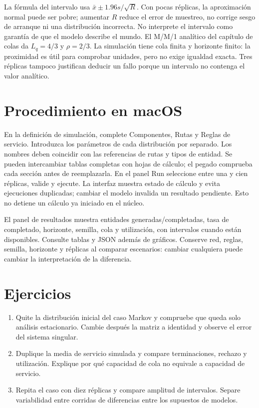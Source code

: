La fórmula del intervalo usa \(\bar x\pm1.96s/\sqrt R\). Con pocas
réplicas, la aproximación normal puede ser pobre; aumentar \(R\) reduce el
error de muestreo, no corrige sesgo de arranque ni una distribución incorrecta.
No interprete el intervalo como garantía de que el modelo describe el mundo.
El M/M/1 analítico del capítulo de colas da \(L_q=4/3\) y \(\rho=2/3\).
La simulación tiene cola finita y horizonte finito: la proximidad es útil para
comprobar unidades, pero no exige igualdad exacta. Tres réplicas tampoco
justifican deducir un fallo porque un intervalo no contenga el valor analítico.

\section{Procedimiento en macOS}
En la definición de simulación, complete Componentes, Rutas y Reglas de servicio.
Introduzca los parámetros de cada distribución por separado. Los nombres deben
coincidir con las referencias de rutas y tipos de entidad. Se pueden intercambiar
tablas completas con hojas de cálculo; el pegado comprueba cada sección antes de
reemplazarla. En el panel Run seleccione entre una y cien réplicas,
valide y ejecute. La interfaz muestra estado de cálculo y evita ejecuciones
duplicadas; cambiar el modelo invalida un resultado pendiente. Esto no detiene
un cálculo ya iniciado en el núcleo.

El panel de resultados muestra entidades generadas/completadas, tasa de
completado, horizonte, semilla, cola y utilización, con intervalos cuando están
disponibles. Consulte tablas y JSON además de gráficos. Conserve red, reglas,
semilla, horizonte y réplicas al comparar escenarios: cambiar cualquiera puede
cambiar la interpretación de la diferencia.

\section{Ejercicios}
\begin{enumerate}
\item Quite la distribución inicial del caso Markov y compruebe que queda solo
análisis estacionario. Cambie después la matriz a identidad y observe el error
del sistema singular.
\item Duplique la media de servicio simulada y compare terminaciones, rechazo y
utilización. Explique por qué capacidad de cola no equivale a capacidad de servicio.
\item Repita el caso con diez réplicas y compare amplitud de intervalos. Separe
variabilidad entre corridas de diferencias entre los supuestos de modelos.
\end{enumerate}

